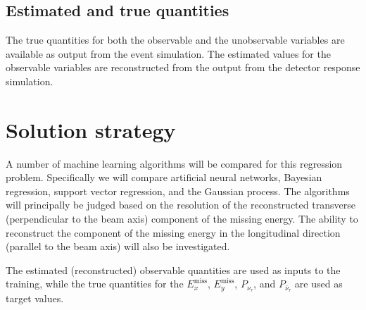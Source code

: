 \documentclass{scrartcl}
\newcommand{\exmiss}{$E_x^\text{miss}$}
\newcommand{\eymiss}{$E_y^\text{miss}$}
\begin{document}
\subsection{Estimated and true quantities}
The true quantities for both the observable and the unobservable variables are available as output from the event simulation. The estimated values for the observable variables are reconstructed from the output from the detector response simulation.

\section{Solution strategy}
A number of machine learning algorithms will be compared for this regression problem. Specifically we will compare artificial neural networks, Bayesian regression, support vector regression, and the Gaussian process. The algorithms will principally be judged based on the resolution of the reconstructed transverse (perpendicular to the beam axis) component of the missing energy. The ability to reconstruct the component of the missing energy in the longitudinal direction (parallel to the beam axis) will also be investigated.

The estimated (reconstructed) observable quantities are used as inputs to the training, while the true quantities for the \exmiss, \eymiss, $P_{\nu_\tau}$, and $P_{\bar\nu_\tau}$ are used as target values.


\end{document}
